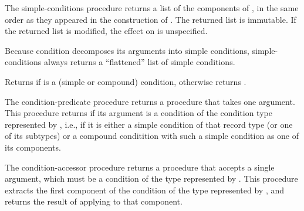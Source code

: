 \begin{entry}{%
}

The {\cf simple-conditions}
procedure returns a list of the components of , in the same
order as they appeared in the construction of .  The
returned list is immutable.  If the returned list is modified, the
effect on  is unspecified.

\begin{note}
  Because {\cf condition} decomposes its arguments into simple
  conditions, {\cf simple-conditions} always returns a ``flattened''
  list of simple conditions.
\end{note}
\end{entry}


\begin{entry}{%
}

Returns \schtrue{} if  is a (simple or compound) condition,
otherwise returns \schfalse.
\end{entry}

\begin{entry}{%
}

  The {\cf condition-predicate} procedure returns
a procedure that takes one argument.  This procedure returns
\schtrue{} if its argument is a condition of the condition type
represented by , i.e., if it is either a simple condition of
that record type (or one of its subtypes) or a compound conditition
with such a simple condition as one of its components.
\end{entry}

\begin{entry}{%
}

  The {\cf
  condition-accessor} procedure returns a procedure that accepts a
single argument, which must be a condition of the type represented by
.  This procedure extracts the first component of the
condition of the type represented by , and returns the result
of applying  to that component.
\end{entry}

